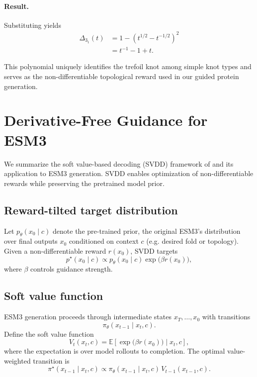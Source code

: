 \documentclass{article}
\begin{document}
\paragraph{Result.}
Substituting yields
\begin{align}
\Delta_{3_1}(t)
&= 1 - \left(t^{1/2} - t^{-1/2}\right)^2 \\
&= t^{-1} - 1 + t.
\end{align}

This polynomial uniquely identifies the trefoil knot among simple knot types and serves as the non-differentiable topological reward used in our guided protein generation.

\section{Derivative-Free Guidance for ESM3}
\label{app:dfg_esm3}

We summarize the soft value-based decoding (SVDD) framework of \cite{Li2024} and its application to ESM3 generation.
SVDD enables optimization of non-differentiable rewards while preserving the pretrained model prior.

\subsection{Reward-tilted target distribution}
Let $p_\theta(x_0\mid c)$ denote the pre-trained prior, the original ESM3's distribution over final outputs $x_0$ conditioned on context $c$ (e.g. desired fold or topology).
Given a non-differentiable reward $r(x_0)$, SVDD targets
\begin{equation}
p^\star(x_0\mid c) \propto p_\theta(x_0\mid c)\exp\!\big(\beta r(x_0)\big),
\label{eq:svdd_target}
\end{equation}
where $\beta$ controls guidance strength.

\subsection{Soft value function}
ESM3 generation proceeds through intermediate states $x_T,\dots,x_0$ with transitions
\begin{equation}
\pi_\theta(x_{t-1}\mid x_t,c).
\end{equation}
Define the soft value function
\begin{equation}
V_t(x_t,c)
=
\mathbb{E}\!\left[\exp\!\big(\beta r(x_0)\big)\mid x_t,c\right],
\label{eq:svdd_value}
\end{equation}
where the expectation is over model rollouts to completion.
The optimal value-weighted transition is
\begin{equation}
\pi^\star(x_{t-1}\mid x_t,c)
\propto
\pi_\theta(x_{t-1}\mid x_t,c)\,V_{t-1}(x_{t-1},c).
\label{eq:svdd_policy}
\end{equation}
\end{document}
